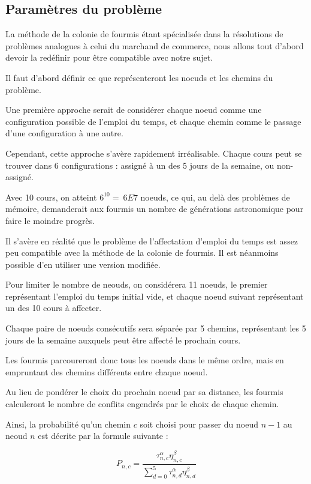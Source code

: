 
\subsection {Paramètres du problème}

La méthode de la colonie de fourmis étant spécialisée dans la résolutions de problèmes analogues à celui du marchand de commerce, nous allons tout d'abord devoir la redéfinir pour être compatible avec notre sujet.

Il faut d'abord définir ce que représenteront les noeuds et les chemins du problème.

Une première approche serait de considérer chaque noeud comme une configuration possible de l'emploi du temps, et chaque chemin comme le passage d'une configuration à une autre.

Cependant, cette approche s'avère rapidement irréalisable. Chaque cours peut se trouver dans 6 configurations : assigné à un des 5 jours de la semaine, ou non-assigné.

Avec 10 cours, on atteint $6^{10} = ~6E7$ noeuds, ce qui, au delà des problèmes de mémoire, demanderait aux fourmis un nombre de générations astronomique pour faire le moindre progrès.

Il s'avère en réalité que le problème de l'affectation d'emploi du temps est assez peu compatible avec la méthode de la colonie de fourmis. Il est néanmoins possible d'en utiliser une version modifiée.

Pour limiter le nombre de neouds, on considérera 11 noeuds, le premier représentant l'emploi du temps initial vide, et chaque noeud suivant représentant un des 10 cours à affecter.

Chaque paire de noeuds consécutifs sera séparée par 5 chemins, représentant les 5 jours de la semaine auxquels peut être affecté le prochain cours.

Les fourmis parcoureront donc tous les noeuds dans le même ordre, mais en empruntant des chemins différents entre chaque noeud.

Au lieu de pondérer le choix du prochain noeud par sa distance, les fourmis calculeront le nombre de conflits engendrés par le choix de chaque chemin.

Ainsi, la probabilité qu'un chemin $c$ soit choisi pour passer du noeud $n-1$ au neoud $n$ est décrite par la formule suivante : 

$$P_{n,c} = \frac{\tau^{\alpha}_{n,c}\eta^{\beta}_{n,c}}{\sum^{5}_{d = 0}{\tau^{\alpha}_{n,d}\eta^{\beta}_{n,d}}}$$

